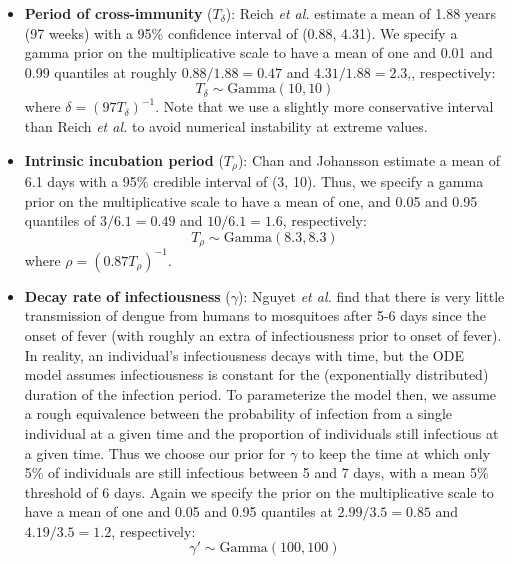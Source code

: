 \documentclass[10pt,letterpaper]{article}
\begin{document}
\begin{itemize}
\item \textbf{Period of cross-immunity} ($T_{\delta}$): Reich \emph{et al.} \cite{Reich2013} estimate a mean of 1.88 years (97 weeks) with a 95\% confidence interval of (0.88, 4.31).
We specify a gamma prior on the multiplicative scale to have a mean of one and 0.01 and 0.99 quantiles at roughly $0.88/1.88 = 0.47$ and $4.31/1.88 = 2.3$,, respectively:
\begin{equation}
T_{\delta} \sim \text{Gamma}(10, 10)
\end{equation}
where $\delta = (97 T_\delta)^{-1}$.
Note that we use a slightly more conservative interval than Reich \emph{et al.} to avoid numerical instability at extreme values.
\\
\item \textbf{Intrinsic incubation period} ($T_{\rho}$): Chan and Johansson \cite{Chan2012} estimate a mean of 6.1 days with a 95\% credible interval of (3, 10).
Thus, we specify a gamma prior on the multiplicative scale to have a mean of one, and 0.05 and 0.95 quantiles of $3 / 6.1 = 0.49$ and $10 / 6.1 = 1.6$, respectively:
\begin{equation}
T_{\rho} \sim \text{Gamma}(8.3, 8.3)
\end{equation}
where $\rho = (0.87 T_{\rho})^{-1}$.
\\
\item \textbf{Decay rate of infectiousness} ($\gamma$): Nguyet \emph{et al.} \cite{Nguyet2013} find that there is very little transmission of dengue from humans to mosquitoes after 5-6 days since the onset of fever (with roughly an extra of infectiousness prior to onset of fever).
In reality, an individual's infectiousness decays with time, but the ODE model assumes infectiousness is constant for the (exponentially distributed) duration of the infection period.    
To parameterize the model then, we assume a rough equivalence between the probability of infection from a single individual at a given time and the proportion of individuals still infectious at a given time.
Thus we choose our prior for $\gamma$ to keep the time at which only 5\% of individuals are still infectious between 5 and 7 days, with a mean 5\% threshold of 6 days.
Again we specify the prior on the multiplicative scale to have a mean of one and 0.05 and 0.95 quantiles at $2.99/3.5 = 0.85$ and $4.19 / 3.5 = 1.2$, respectively:
\begin{equation}
\gamma' \sim \text{Gamma}(100, 100)
\end{equation}

\end{itemize}
\end{document}
